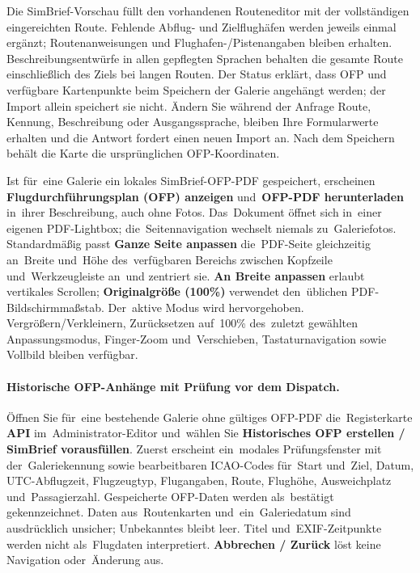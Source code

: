 \documentclass[11pt,a4paper]{article}
\newcommand{\ui}[1]{\textbf{#1}}
\begin{document}
Die SimBrief-Vorschau füllt den vorhandenen Routeneditor mit der vollständigen
eingereichten Route. Fehlende Abflug- und Zielflughäfen werden jeweils einmal
ergänzt; Routenanweisungen und Flughafen-/Pistenangaben bleiben erhalten.
Beschreibungsentwürfe in allen gepflegten Sprachen behalten die gesamte Route
einschließlich des Ziels bei langen Routen. Der Status erklärt, dass OFP und
verfügbare Kartenpunkte beim Speichern der Galerie angehängt werden; der Import
allein speichert sie nicht. Ändern Sie während der Anfrage Route, Kennung,
Beschreibung oder Ausgangssprache, bleiben Ihre Formularwerte erhalten und die
Antwort fordert einen neuen Import an. Nach dem Speichern behält die Karte die
ursprünglichen OFP-Koordinaten.

Ist für~eine Galerie ein lokales SimBrief-OFP-PDF gespeichert, erscheinen
\ui{Flugdurchführungsplan (OFP) anzeigen} und~\ui{OFP-PDF herunterladen}
in~ihrer Beschreibung, auch ohne Fotos. Das~Dokument öffnet sich in~einer
eigenen PDF-Lightbox; die~Seitennavigation wechselt niemals zu~Galeriefotos.
Standardmäßig passt \ui{Ganze Seite anpassen} die~PDF-Seite gleichzeitig
an~Breite und~Höhe des~verfügbaren Bereichs zwischen Kopfzeile
und~Werkzeugleiste an~und zentriert sie. \ui{An Breite anpassen} erlaubt
vertikales Scrollen; \ui{Originalgröße (100\%)} verwendet den~üblichen
PDF-Bildschirmmaßstab. Der~aktive Modus wird hervorgehoben.
Vergrößern/Verkleinern, Zurücksetzen auf~100\% des~zuletzt gewählten
Anpassungsmodus, Finger-Zoom und~Verschieben, Tastaturnavigation sowie Vollbild
bleiben verfügbar.

\paragraph{Historische OFP-Anhänge mit Prüfung vor dem Dispatch.}
Öffnen Sie für~eine bestehende Galerie ohne gültiges OFP-PDF die~Registerkarte
\ui{API} im~Administrator-Editor und~wählen Sie \ui{Historisches OFP erstellen /
SimBrief vorausfüllen}. Zuerst erscheint ein~modales Prüfungsfenster mit
der~Galeriekennung sowie bearbeitbaren ICAO-Codes für~Start und~Ziel, Datum,
UTC-Abflugzeit, Flugzeugtyp, Flugangaben, Route, Flughöhe, Ausweichplatz
und~Passagierzahl. Gespeicherte OFP-Daten werden als~bestätigt gekennzeichnet.
Daten aus~Routenkarten und~ein~Galeriedatum sind ausdrücklich unsicher;
Unbekanntes bleibt leer. Titel und~EXIF-Zeitpunkte werden nicht als~Flugdaten
interpretiert. \ui{Abbrechen / Zurück} löst keine Navigation oder~Änderung aus.
\end{document}
